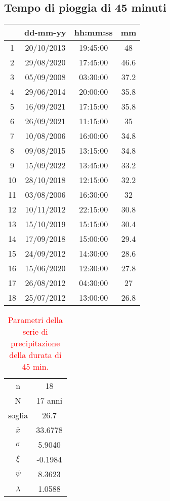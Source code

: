 \subsection{Tempo di pioggia di 45 minuti}
\begin{table}[H] \centering
    \begin{tabular}{cccc}
    \toprule
       & dd-mm-yy   & hh:mm:ss & mm \\
    \midrule
    1  & 20/10/2013 & 19:45:00 & 48   \\
    2  & 29/08/2020 & 17:45:00 & 46.6 \\
    3  & 05/09/2008 & 03:30:00 & 37.2 \\
    4  & 29/06/2014 & 20:00:00 & 35.8 \\
    5  & 16/09/2021 & 17:15:00 & 35.8 \\
    6  & 26/09/2021 & 11:15:00 & 35   \\
    7  & 10/08/2006 & 16:00:00 & 34.8 \\
    8  & 09/08/2015 & 13:15:00 & 34.8 \\
    9  & 15/09/2022 & 13:45:00 & 33.2 \\
    10 & 28/10/2018 & 12:15:00 & 32.2 \\
    11 & 03/08/2006 & 16:30:00 & 32   \\
    12 & 10/11/2012 & 22:15:00 & 30.8 \\
    13 & 15/10/2019 & 15:15:00 & 30.4 \\
    14 & 17/09/2018 & 15:00:00 & 29.4 \\
    15 & 24/09/2012 & 14:30:00 & 28.6 \\
    16 & 15/06/2020 & 12:30:00 & 27.8 \\
    17 & 26/08/2012 & 04:30:00 & 27   \\
    18 & 25/07/2012 & 13:00:00 & 26.8 \\
    \bottomrule
    \end{tabular}
    \end{table}

    \begin{table}[H] \centering
        \caption{\textcolor{red}{Parametri della serie di precipitazione della durata di 45 min.}}
        \begin{tabular}{cc}
            \toprule
        n        &    18     \\
        N        & 17 anni \\
        soglia   &      26.7   \\
        $\bar{x}$ &    33.6778    \\
        $\sigma$ &     5.9040    \\
        $\xi$      &   -0.1984    \\
        $\psi$      &   8.3623  \\
        $\lambda$   &  1.0588  \\
    \bottomrule    
    \end{tabular}
        \end{table}


